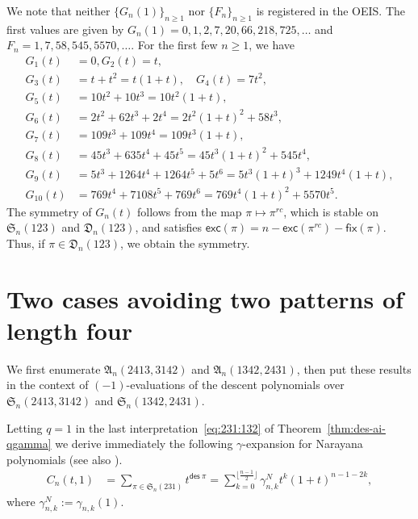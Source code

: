 \documentclass[12pt,reqno]{amsart}
\numberwithin{equation}{section}
\theoremstyle{plain}
\theoremstyle{definition}
\def\S{\mathfrak{S}}
\def\D{\mathfrak{D}}
\def\A{\mathfrak{A}}
\def\exc{\mathsf{exc}}
\def\des{\mathsf{des}}
\def\fix{\mathsf{fix}}
\begin{document}
We note that neither $\{G_n(1)\}_{n\ge 1}$ nor $\{F_n\}_{n\ge 1}$ is registered in the OEIS. The first values are given by $G_n(1)=0, 1, 2, 7, 20, 66, 218, 725,\ldots$ and
$F_n=1, 7, 58, 545, 5570, \ldots$.
For the first few $n\geq 1$, we have
\begin{align*}

G_1(t)&=0, G_2(t)=t,\\
G_3(t)&=t+t^2=t(1+t),\quad
G_4(t)=7t^2,\\
G_5(t)&=10t^2+10t^3=10t^2(1+t),\\
G_6(t)&=2t^2+62t^3+2t^4=2t^2(1+t)^2+58t^3,\\
G_7(t)&=109t^3+109t^4=109t^3(1+t),\\
G_8(t)&=45t^3+635t^4+45t^5=45t^3(1+t)^2+545t^4,\\
G_9(t)&=5t^3+1264t^4+1264t^5+5t^6=5t^3(1+t)^3+1249t^4(1+t),\\
G_{10}(t)&=769t^4+7108t^5+769t^6=769t^4(1+t)^2+5570t^5.
\end{align*}
The symmetry of $G_n(t)$ follows from the map $\pi\mapsto \pi^{rc}$, which is stable on $\S_n(123)$ and $\D_n(123)$, and satisfies  $\exc(\pi) = n-\exc(\pi^{rc})-\fix(\pi)$. Thus, if $\pi\in \D_n(123)$, we obtain the symmetry.



\section{Two cases avoiding two patterns of length four}\label{sec6: Sch}

We first enumerate $\A_n(2413,3142)$ and $\A_n(1342,2431)$, then put these results in the context of $(-1)$-evaluations of the descent polynomials over $\S_n(2413,3142)$ and $\S_n(1342,2431)$.

Letting $q=1$ in the last interpretation~\eqref{eq:231:132}
 of Theorem~\ref{thm:des-ai-qgamma} we derive immediately
the following $\gamma$-expansion for Narayana polynomials (see also \cite[Chapter 4]{Pet}).
\begin{align}
\label{gamma:nara}
C_n(t,1) &=\sum_{\pi\in \S_n(231)} t^{\des\:\pi}
=\sum_{k=0}^{\lfloor\frac{n-1}{2}\rfloor}\gamma_{n,k}^N t^k(1+t)^{n-1-2k},
\end{align}
where $\gamma_{n,k}^N:=\gamma_{n,k}(1)$.
\end{document}

